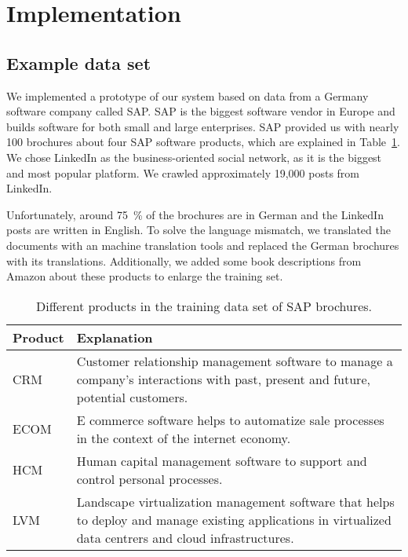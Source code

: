
\section{Implementation}
\label{sec:implementation}


\subsection{Example data set}
\label{sub:initial_data_set}
We implemented a prototype of our \nto system based on data from a Germany software company called SAP.
SAP is the biggest software vendor in Europe and builds software for both small and large enterprises.
SAP provided us with nearly 100 brochures about four SAP software products, which are explained in Table~\ref{table:products}.
We chose LinkedIn as the business-oriented social network, as it is the biggest and most popular platform.
We crawled approximately 19,000 posts from LinkedIn.

Unfortunately, around 75~\% of the brochures are in German and the LinkedIn posts are written in English.
To solve the language mismatch, we translated the documents with an machine translation tools and replaced the German brochures with its translations.
Additionally, we added some book descriptions from Amazon about these products to enlarge the training set.

\begin{table}[h]
	\centering
	\label{table:products}
	{
		\renewcommand\arraystretch{1.25}
		\begin{tabular}{lll}
			\hline
			\textbf{Product} & \multicolumn{2}{l}{\textbf{Explanation}} \\
			\hline\hline
			CRM  & \multicolumn{2}{p{10cm}}{\raggedright
				Customer relationship management software to manage a company's interactions with past, present and future, potential customers.} \\
			\hline
			ECOM  & \multicolumn{2}{p{10cm}}{\raggedright
				E commerce software helps to automatize sale processes in the context of the internet economy.} \\
			\hline
			HCM  & \multicolumn{2}{p{10cm}}{\raggedright
				Human capital management software to support and control personal processes.} \\
			\hline
			LVM  & \multicolumn{2}{p{10cm}}{\raggedright
				Landscape virtualization management software that helps to deploy and manage existing applications  in virtualized data centrers and cloud infrastructures.} \\
			\hline
		\end{tabular}
	}
	\caption{Different products in the training data set of SAP brochures.}
\end{table}

